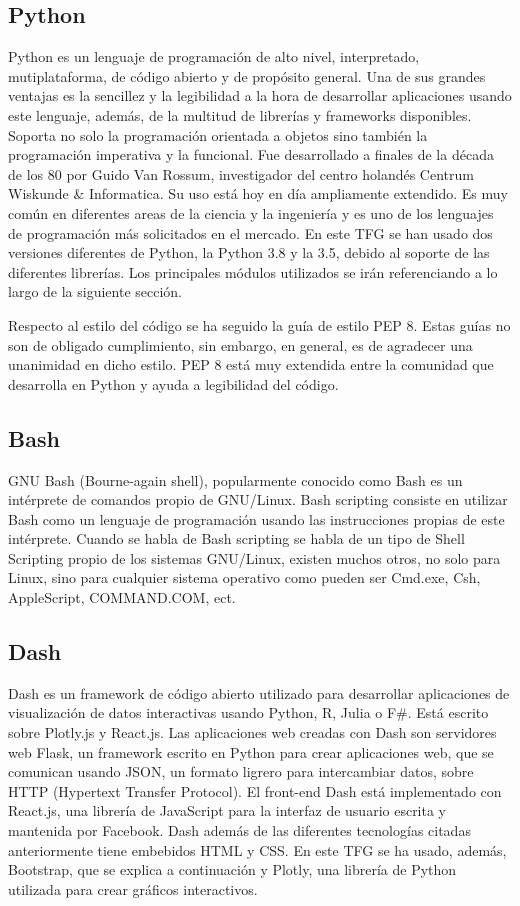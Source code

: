 \documentclass[a4paper, 12pt, oneside]{book}
\begin{document}
\subsection{Python}
\label{subsec:python}
Python es un lenguaje de programación de alto nivel, interpretado, mutiplataforma, de código abierto y de propósito general. Una de sus grandes ventajas es la sencillez y la legibilidad a la hora de desarrollar aplicaciones usando este lenguaje, además, de la multitud de librerías y frameworks disponibles. Soporta no solo la programación orientada a objetos sino también la programación imperativa y la funcional.
Fue desarrollado a finales de la década de los 80 por Guido Van Rossum, investigador del centro holandés Centrum Wiskunde \& Informatica.
Su uso está hoy en día ampliamente extendido. Es muy común en diferentes areas de la ciencia y la ingeniería y es uno de los lenguajes de programación más solicitados en el mercado.
En este TFG se han usado dos versiones diferentes de Python, la Python 3.8 y la 3.5, debido al soporte de las diferentes librerías.
Los principales módulos utilizados se irán referenciando a lo largo de la siguiente sección.

Respecto al estilo del código se ha seguido la guía de estilo PEP 8. Estas guías no son de obligado cumplimiento, sin embargo, en general, es de agradecer una unanimidad en dicho estilo. PEP 8 está muy extendida entre la comunidad que desarrolla en Python y ayuda a legibilidad del código.

\subsection{Bash}
\label{subsec:bash}
GNU Bash (Bourne-again shell), popularmente conocido como Bash es un intérprete de comandos propio de GNU/Linux.
Bash scripting consiste en utilizar Bash como un lenguaje de programación usando las instrucciones propias de este intérprete. Cuando se habla de Bash scripting se habla de un tipo de Shell Scripting propio de los sistemas GNU/Linux, existen muchos otros, no solo para Linux, sino para cualquier sistema operativo como pueden ser Cmd.exe, Csh, AppleScript, COMMAND.COM, ect.

\subsection{Dash}
\label{subsec:dash}

Dash es un framework de código abierto utilizado para desarrollar aplicaciones de visualización de datos interactivas usando Python, R, Julia o F\#. Está escrito sobre Plotly.js y React.js. Las aplicaciones web creadas con Dash son servidores web Flask, un framework escrito en Python para crear aplicaciones web, que se comunican usando JSON, un formato ligrero para intercambiar datos, sobre HTTP (Hypertext Transfer Protocol).
El front-end Dash está implementado con React.js, una librería de JavaScript para la interfaz de usuario escrita y mantenida por Facebook. Dash además de las diferentes tecnologías citadas anteriormente tiene embebidos HTML y CSS. En este TFG se ha usado, además, Bootstrap, que se explica a continuación y Plotly, una librería de Python utilizada para crear gráficos interactivos.
\end{document}
